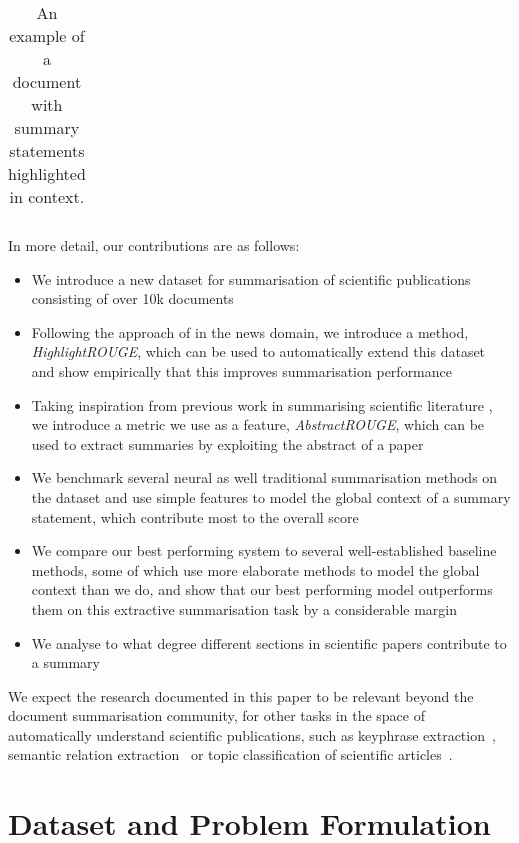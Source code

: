 \documentclass[11pt,a4paper]{article}
\begin{document}
\begin{table}[t]
\begin{center}
\begin{tabularx}{\linewidth}{X}
\bottomrule
\end{tabularx}
\end{center}
\caption{\label{fig:summ_ex} An example of a document with summary statements highlighted in context.
}
\end{table}

In more detail, our contributions are as follows:
\begin{itemize}[noitemsep]
\item{We introduce a new dataset for summarisation of scientific publications consisting of over 10k documents}
\item{Following the approach of \cite{hermann2015teaching} in the news domain, we introduce a method, \textit{HighlightROUGE}, which can be used to automatically extend this dataset %
and show empirically that this improves summarisation performance}
\item{Taking inspiration from previous work in summarising scientific literature \citep{kupiec1995trainable, papers_citationSaggion2016}, we introduce a 
metric we use as a feature, \textit{AbstractROUGE}, which can be used to extract summaries by exploiting the abstract of a paper}
\item{We benchmark several neural as well traditional summarisation methods on the dataset and use simple features to model the global context of a summary statement, which contribute most to the overall score}
\item{We compare our best performing system to several well-established baseline methods, some of which use more elaborate methods to model the global context than we do, and show that our best performing model outperforms them on this extractive summarisation task by a considerable margin}
\item{We analyse to what degree different sections in scientific papers contribute to a summary}
\end{itemize}
We expect the research documented in this paper to be relevant beyond the document summarisation community, for other tasks in the space of automatically understand scientific publications, such as keyphrase extraction~\cite{kim-EtAl:2010:SemEval,sterckx2016supervised,augenstein2017scienceie,augenstein2017multitask}, semantic relation extraction~\cite{gupta-manning:2011:IJCNLP-2011,marsi-ozturk:2015:EMNLP} or topic classification of scientific articles~\cite{oseaghdha-teufel:2014:Coling}.


\section{Dataset and Problem Formulation}
\end{document}
